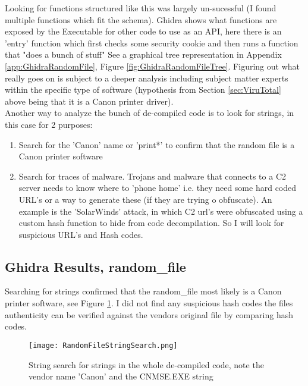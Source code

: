 \documentclass[
	letterpaper, %
	10pt, %
	unnumberedsections, %
	twoside, %
]{APAAssignment}
\begin{document}
Looking for functions structured like this was largely un-sucessful (I found multiple functions which fit the schema). Ghidra shows what functions are exposed by the Executable for other code to use as an API, here there is an 'entry' function which first checks some security cookie and then runs a function that "does a bunch of stuff" See a graphical tree representation in Appendix \ref{app:GhidraRandomFile}, Figure \ref{fig:GhidraRandomFileTree}. Figuring out what really goes on is subject to a deeper analysis including subject matter experts within the specific type of software (hypothesis from Section \ref{sec:ViruTotal} above being that it is a Canon printer driver). \\
Another way to analyze the bunch of de-compiled code is to look for strings, in this case for 2 purposes:
\begin{enumerate}
	\item Search for the 'Canon' name or 'print*' to confirm that the random file is a Canon printer software
	\item Search for traces of malware. Trojans and malware that connects to a C2 server needs to know where to 'phone home' i.e. they need some hard coded URL's or a way to generate these (if they are trying o obfuscate). An example is the 'SolarWinds' attack, in which C2 url's were obfuscated using a custom hash function to hide from code decompilation\cite{MandiantSW}. So I will look for suspicious URL's and Hash codes. 
\end{enumerate}

\subsection{Ghidra Results, random\_file}
Searching for strings confirmed that the random\_file most likely is a Canon printer software, see Figure \ref{fig:GhidraRandomFileString}. I did not find any suspicious hash codes the files authenticity can be verified against the vendors original file by comparing hash codes.

\begin{figure}[!htp] %
	\centering
	\texttt{[image: RandomFileStringSearch.png]}
	\caption{String search for strings in the whole de-compiled code, note the vendor name 'Canon' and the CNMSE.EXE string}
	\label{fig:GhidraRandomFileString}
\end{figure}
\end{document}
